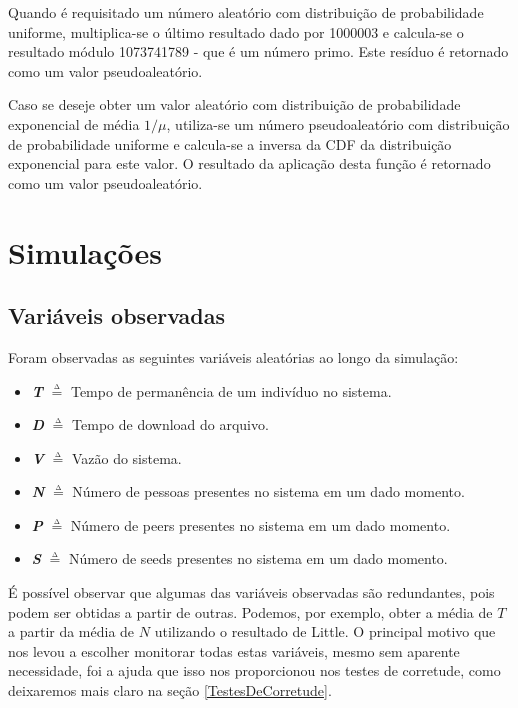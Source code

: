 \documentclass[a4paper,10pt]{article}
\begin{document}
Quando é requisitado um número aleatório com distribuição de probabilidade uniforme, multiplica-se o último resultado dado por 1000003 e calcula-se o resultado módulo 1073741789 - que é um número primo. Este resíduo é retornado como um valor pseudoaleatório.

Caso se deseje obter um valor aleatório com distribuição de probabilidade exponencial de média $1 / \mu$, utiliza-se um número pseudoaleatório com distribuição de probabilidade uniforme e calcula-se a inversa da CDF da distribuição exponencial para este valor. O resultado da aplicação desta função é retornado como um valor pseudoaleatório.

\pagebreak

\section{Simulações}

\subsection{Variáveis observadas}

Foram observadas as seguintes variáveis aleatórias ao longo da simulação:
\begin{itemize}
	\item \textbf{\textit{T}} $\overset{\underset{\mathrm{\Delta}}{}}{=}$ Tempo de permanência de um indivíduo no sistema.
	\item \textbf{\textit{D}} $\overset{\underset{\mathrm{\Delta}}{}}{=}$ Tempo de download do arquivo.
	\item \textbf{\textit{V}} $\overset{\underset{\mathrm{\Delta}}{}}{=}$ Vazão do sistema.
	\item \textbf{\textit{N}} $\overset{\underset{\mathrm{\Delta}}{}}{=}$ Número de pessoas presentes no sistema em um dado momento.
	\item \textbf{\textit{P}} $\overset{\underset{\mathrm{\Delta}}{}}{=}$ Número de peers presentes no sistema em um dado momento.
	\item \textbf{\textit{S}} $\overset{\underset{\mathrm{\Delta}}{}}{=}$ Número de seeds presentes no sistema em um dado momento.
\end{itemize}

É possível observar que algumas das variáveis observadas são redundantes, pois podem ser obtidas a partir de outras. Podemos, por exemplo, obter a média de $T$ a partir da média de $N$ utilizando o resultado de Little. O principal motivo que nos levou a escolher monitorar todas estas variáveis, mesmo sem aparente necessidade, foi a ajuda que isso nos proporcionou nos testes de corretude, como deixaremos mais claro na seção \ref{TestesDeCorretude}.
\end{document}
